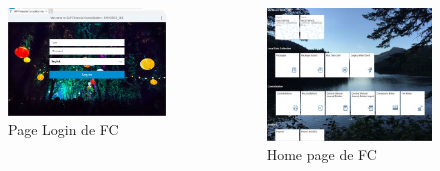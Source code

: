 \documentclass{beamer}
\begin{document}
        \begin{frame}[t]
            \begin{columns}
                \begin{figure}
                    \centering
                    \includegraphics[width=\textwidth]{FC_pageLogin.JPG}
                    \caption{Page Login de FC}
                    \label{fig:FC_login_label}
                \end{figure}
                
                \begin{figure}
                    \centering
                    \includegraphics[width=\textwidth]{FC_Homepage.JPG}
                    \caption{Home page de FC}
                    \label{fig:FC_homepage_label}
                \end{figure}
            \end{columns}
            
        \end{frame}
        
\end{document}
